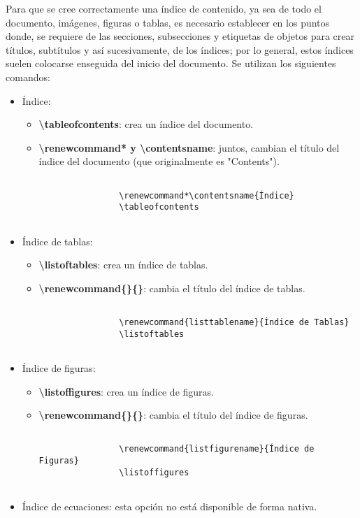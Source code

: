 Para que se cree correctamente una índice de contenido, ya sea de todo el documento, imágenes, figuras o tablas, es necesario establecer en los puntos donde, se requiere de las secciones, subsecciones y etiquetas de objetos para crear títulos, subtítulos y así sucesivamente, de los índices; por lo general, estos índices suelen colocarse enseguida del inicio del documento. Se utilizan los siguientes comandos:
\begin{itemize}
    \item Índice:
    \begin{itemize}
        \item \textbf{\textbackslash{tableofcontents}}: crea un índice del documento.
        \item \textbf{\textbackslash{renewcommand*} y \textbackslash{contentsname}}: juntos, cambian el título del índice del documento (que originalmente es "Contents").
        \begin{lstlisting}
            
                \renewcommand*\contentsname{Índice}
                \tableofcontents
            
        \end{lstlisting}
    \end{itemize}
    \item Índice de tablas:
    \begin{itemize}
        \item \textbf{\textbackslash{listoftables}}: crea un índice de tablas.
        \item \textbf{\textbackslash{renewcommand\{\}\{\}}}: cambia el título del índice de tablas.
        \begin{lstlisting}
            
                \renewcommand{listtablename}{Índice de Tablas}
                \listoftables
            
        \end{lstlisting}
    \end{itemize}
    \item Índice de figuras:
    \begin{itemize}
        \item \textbf{\textbackslash{listoffigures}}: crea un índice de figuras.
        \item \textbf{\textbackslash{renewcommand\{\}\{\}}}: cambia el título del índice de figuras.
        \begin{lstlisting}
            
                \renewcommand{listfigurename}{Índice de Figuras}
                \listoffigures
            
        \end{lstlisting}
    \end{itemize}
    \item Índice de ecuaciones: esta opción no está disponible de forma nativa.
\end{itemize}


